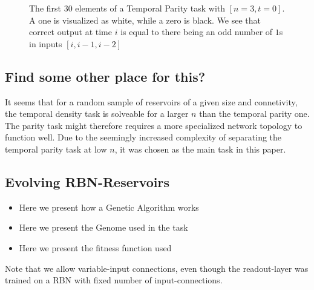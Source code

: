 \begin{figure}


  \caption{
    The first 30 elements of a Temporal Parity task with $[n=3, t=0]$.
    A one is visualized as white, while a zero is black.
    We see that correct output at time $i$ is equal to there being an odd number of $1$s in inputs $[i, i-1, i-2]$
  }
  \label{figure:temporal-parity}
\end{figure}

\subsection{Find some other place for this?}

It seems that for a random sample of reservoirs of a given size and connetivity,
the temporal density task is solveable for a larger $ n $ than the temporal parity one.
The parity task might therefore requires a more specialized network topology to function well.
Due to the seemingly increased complexity of separating the temporal parity task at low $ n $,
it was chosen as the main task in this paper.


\subsection{Evolving RBN-Reservoirs}

\begin{itemize}
  \item Here we present how a Genetic Algorithm works
  \item Here we present the Genome used in the task
  \item Here we present the fitness function used
\end{itemize}

Note that we allow variable-input connections, even though the readout-layer was trained on a RBN with fixed number of input-connections.

